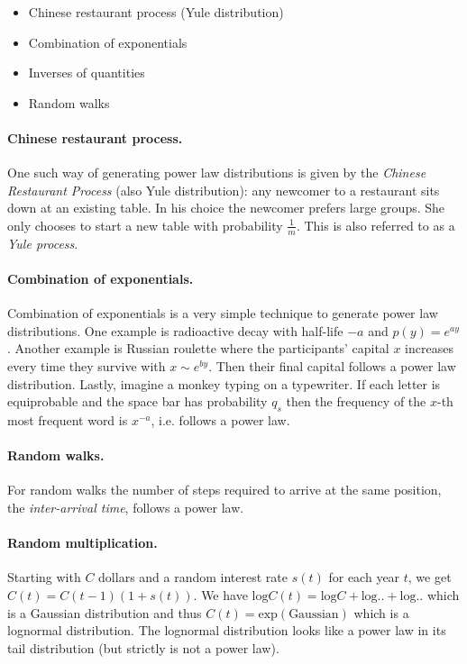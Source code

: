 \begin{itemize}
    \item Chinese restaurant process (Yule distribution)
    \item Combination of exponentials
    \item Inverses of quantities
    \item Random walks
\end{itemize}

\paragraph{Chinese restaurant process.}
One such way of generating power law distributions is given by the \emph{Chinese Restaurant Process} (also Yule distribution): any newcomer to a restaurant sits down at an existing table. In his choice the newcomer prefers large groups. She only chooses to start a new table with probability $\frac{1}{m}$. This is also referred to as a \emph{Yule process}.

\paragraph{Combination of exponentials.}
Combination of exponentials is a very simple technique to generate power law distributions. One example is radioactive decay with half-life $-a$ and $p(y) = e^{ay}$. Another example is Russian roulette where the participants' capital $x$ increases every time they survive with $x \sim e^{by}$. Then their final capital follows a power law distribution. Lastly, imagine a monkey typing on a typewriter. If each letter is equiprobable and the space bar has probability $q_s$ then the frequency of the $x$-th most frequent word is $x^{-a}$, i.e. follows a power law.

\paragraph{Random walks.}
For random walks the number of steps required to arrive at the same position, the \emph{inter-arrival time}, follows a power law.

\paragraph{Random multiplication.}
Starting with $C$ dollars and a random interest rate $s(t)$ for each year $t$, we get $C(t) = C(t-1) (1+s(t))$. We have $\text{log} C(t) = \text{log} C + \text{log} .. + \text{log} ..$ which is a Gaussian distribution and thus $C(t) = \text{exp}(\text{Gaussian})$ which is a lognormal distribution. The lognormal distribution looks like a power law in its tail distribution (but strictly is not a power law).

